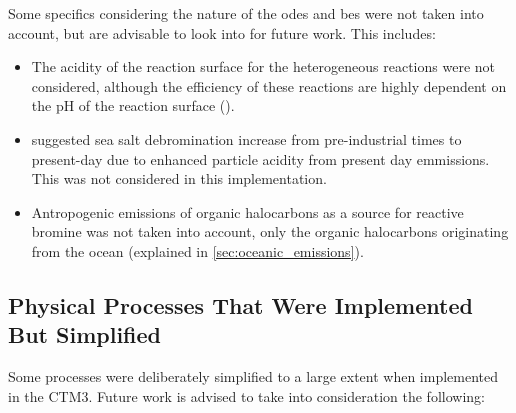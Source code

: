 Some specifics considering the nature of the \acrshort{ode}s and \acrlong{be}s were not taken into account, but are advisable to look into for future work. This includes: 
\begin{itemize}
    \item The acidity of the reaction surface for the heterogeneous reactions were not considered, although the efficiency of these reactions are highly dependent on the pH of the reaction surface (\cite{KerriAPratt2013}).
    \item \cite{Parella} suggested sea salt debromination increase from pre-industrial times to present-day due to enhanced particle acidity from present day emmissions. This was not considered in this implementation.
    \item Antropogenic emissions of organic halocarbons as a source for reactive bromine was not taken into account, only the organic halocarbons originating from the ocean (explained in \ref{sec:oceanic_emissions}).  
\end{itemize}

\subsection{Physical Processes That Were Implemented But Simplified}

Some processes were deliberately simplified to a large extent when implemented in the CTM3. Future work is advised to take into consideration the following: 

